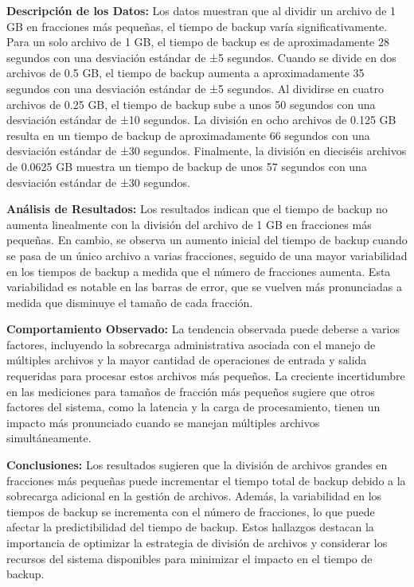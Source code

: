 \textbf{Descripción de los Datos:}
Los datos muestran que al dividir un archivo de 1 GB en fracciones más pequeñas, el tiempo de backup varía significativamente. Para un solo archivo de 1 GB, el tiempo de backup es de aproximadamente 28 segundos con una desviación estándar de ±5 segundos. Cuando se divide en dos archivos de 0.5 GB, el tiempo de backup aumenta a aproximadamente 35 segundos con una desviación estándar de ±5 segundos. Al dividirse en cuatro archivos de 0.25 GB, el tiempo de backup sube a unos 50 segundos con una desviación estándar de ±10 segundos. La división en ocho archivos de 0.125 GB resulta en un tiempo de backup de aproximadamente 66 segundos con una desviación estándar de ±30 segundos. Finalmente, la división en dieciséis archivos de 0.0625 GB muestra un tiempo de backup de unos 57 segundos con una desviación estándar de ±30 segundos.

\textbf{Análisis de Resultados:}
Los resultados indican que el tiempo de backup no aumenta linealmente con la división del archivo de 1 GB en fracciones más pequeñas. En cambio, se observa un aumento inicial del tiempo de backup cuando se pasa de un único archivo a varias fracciones, seguido de una mayor variabilidad en los tiempos de backup a medida que el número de fracciones aumenta. Esta variabilidad es notable en las barras de error, que se vuelven más pronunciadas a medida que disminuye el tamaño de cada fracción.

\textbf{Comportamiento Observado:}
La tendencia observada puede deberse a varios factores, incluyendo la sobrecarga administrativa asociada con el manejo de múltiples archivos y la mayor cantidad de operaciones de entrada y salida requeridas para procesar estos archivos más pequeños. La creciente incertidumbre en las mediciones para tamaños de fracción más pequeños sugiere que otros factores del sistema, como la latencia y la carga de procesamiento, tienen un impacto más pronunciado cuando se manejan múltiples archivos simultáneamente.

\textbf{Conclusiones:}
Los resultados sugieren que la división de archivos grandes en fracciones más pequeñas puede incrementar el tiempo total de backup debido a la sobrecarga adicional en la gestión de archivos. Además, la variabilidad en los tiempos de backup se incrementa con el número de fracciones, lo que puede afectar la predictibilidad del tiempo de backup. Estos hallazgos destacan la importancia de optimizar la estrategia de división de archivos y considerar los recursos del sistema disponibles para minimizar el impacto en el tiempo de backup.

